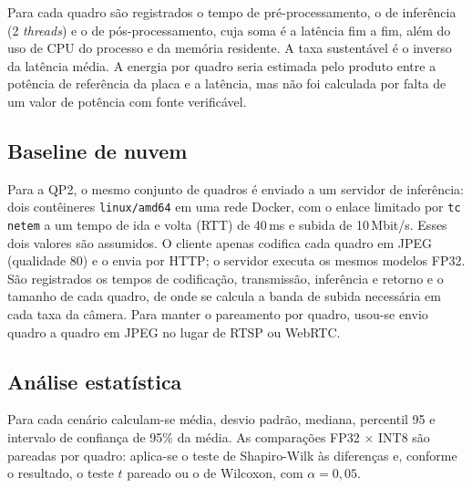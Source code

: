 Para cada quadro são registrados o tempo de pré-processamento, o de inferência (2 \textit{threads}) e o de pós-processamento, cuja soma é a latência fim a fim, além do uso de CPU do processo e da memória residente. A taxa sustentável é o inverso da latência média. A energia por quadro seria estimada pelo produto entre a potência de referência da placa e a latência, mas não foi calculada por falta de um valor de potência com fonte verificável.

\subsection{Baseline de nuvem}

Para a QP2, o mesmo conjunto de quadros é enviado a um servidor de inferência: dois contêineres \texttt{linux/amd64} em uma rede Docker, com o enlace limitado por \texttt{tc netem} a um tempo de ida e volta (RTT) de 40\,ms e subida de 10\,Mbit/s. Esses dois valores são assumidos.  O cliente apenas codifica cada quadro em JPEG (qualidade 80) e o envia por HTTP; o servidor executa os mesmos modelos FP32. São registrados os tempos de codificação, transmissão, inferência e retorno e o tamanho de cada quadro, de onde se calcula a banda de subida necessária em cada taxa da câmera. Para manter o pareamento por quadro, usou-se envio quadro a quadro em JPEG no lugar de RTSP ou WebRTC.

\subsection{Análise estatística}

Para cada cenário calculam-se média, desvio padrão, mediana, percentil 95 e intervalo de confiança de 95\% da média. As comparações FP32 $\times$ INT8 são pareadas por quadro: aplica-se o teste de Shapiro-Wilk às diferenças e, conforme o resultado, o teste $t$ pareado ou o de Wilcoxon, com $\alpha = 0{,}05$.

